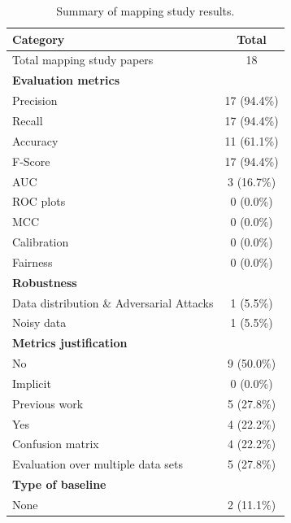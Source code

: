 \documentclass[a4paper]{article}
\begin{document}
\begin{table}[H]
	\centering
	\captionsetup{justification=centering}
	\caption{Summary of mapping study results.}
	\begin{tabularx}{0.7\textwidth}{|X|c|}
		\hline
		\textbf{Category} & \textbf{Total} \\
		\hline
		Total mapping study papers & 18 \\
		\hline
		\textbf{Evaluation metrics} & \\
		\hspace{3mm} Precision & 17 (94.4\%)  \\
		\hspace{3mm} Recall & 17 (94.4\%) \\
		\hspace{3mm} Accuracy & 11 (61.1\%) \\
		\hspace{3mm} F-Score & 17 (94.4\%)\\
		\hspace{3mm} AUC & 3 (16.7\%) \\
		\hspace{3mm} ROC plots & 0 (0.0\%) \\
		\hspace{3mm} MCC & 0 (0.0\%) \\
		Calibration & 0 (0.0\%) \\
		Fairness &  0 (0.0\%) \\
		\textbf{Robustness} &  \\
		\hspace{3mm} Data distribution \& Adversarial Attacks & 1 (5.5\%)  \\
		\hspace{3mm} Noisy data & 1 (5.5\%) \\
		\textbf{Metrics justification} &\\
		\hspace{3mm} No & 9 (50.0\%) \\
		\hspace{3mm} Implicit & 0 (0.0\%) \\
		\hspace{3mm} Previous work & 5 (27.8\%) \\
		\hspace{3mm} Yes & 4 (22.2\%) \\
		Confusion matrix & 4 (22.2\%) \\
		Evaluation over multiple data sets & 5 (27.8\%) \\
		\textbf{Type of baseline} &\\
		\hspace{3mm} None & 2 (11.1\%) \\

\end{tabularx}
\end{table}
\end{document}
